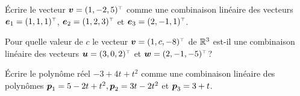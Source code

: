 \begin{exerciceC}
Écrire le vecteur $ \mat{v} = \transp{(1, -2, 5)}$ comme une combinaison linéaire des vecteurs 
$\mat{e}_1 = \transp{(1, 1, 1)}$, $\mat{e}_2 = \transp{(1, 2, 3)}$ et $\mat{e}_3 = \transp{(2, -1, 1)}$.
\end{exerciceC}
\begin{exerciceC}
Pour quelle valeur de $c$ le vecteur $\mat{v} = \transp{(1, c, -8)}$ de $\mathbb{R}^3$ est-il une
combinaison linéaire des vecteurs $\mat{u} = \transp{(3, 0, 2)}$ et $\mat{w} = \transp{(2, -1, -5)}$?
\end{exerciceC}
\begin{exerciceC}
Écrire le polynôme réel $-3 + 4t + t^2$ comme une combinaison linéaire des polynômes
$\boldsymbol{p}_1 = 5 -2t + t^2, \boldsymbol{p}_2 = 3t - 2t^2$ et $\boldsymbol{p}_3 = 3+t$.
\end{exerciceC}


